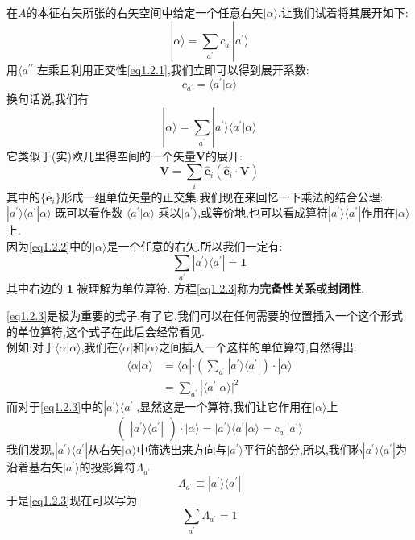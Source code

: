 \documentclass[lang=cn,newtx,10pt,scheme=chinese,thmcnt=section]{elegantbook}
\begin{document}
在$A$的本征右矢所张的右矢空间中给定一个任意右矢$|\alpha\rangle$,让我们试着将其展开如下:
\begin{equation}
	|\alpha\rangle=\sum_{a^{\prime}}c_{a^{\prime}}|a^{\prime}\rangle
\end{equation}
用$\langle a^{\prime\prime}|$左乘且利用正交性\ref{eq1.2.1},我们立即可以得到展开系数:
$$c_{a^{\prime}}=\langle a^{\prime}|\alpha\rangle$$
换句话说,我们有
\begin{equation}\label{eq1.2.2}
	|\alpha\rangle=\sum_{a^{\prime}}|a^{\prime}\rangle\langle a^{\prime}|\alpha\rangle
\end{equation}
它类似于(实)欧几里得空间的一个矢量$\mathbf{V}$的展开:
$$\mathbf{V}=\sum_i\hat{\mathbf{e}}_i(\hat{\mathbf{e}}_i\cdot\mathbf{V})$$
其中的$\{\hat{\mathbf{e}}_i\}$形成一组单位矢量的正交集.我们现在来回忆一下乘法的结合公理:$|a^\prime\rangle\langle a^{\prime}|\alpha\rangle$ 既可以看作数 $\langle a^\prime|\alpha\rangle$ 乘以$|a^\prime\rangle$,或等价地,也可以看成算符$|a^\prime\rangle\langle a^\prime|$作用在$|\alpha\rangle$上.\\
因为\ref{eq1.2.2}中的$|\alpha\rangle$是一个任意的右矢.所以我们一定有:
\begin{equation}\label{eq1.2.3}
	\sum_{a^{\prime}}|a^{\prime}\rangle\langle a^{\prime}|=\mathbf{1}
\end{equation}
其中右边的 $\mathbf{1}$ 被理解为单位算符. 方程\ref{eq1.2.3}称为\textbf{完备性关系}或\textbf{封闭性}.

\ref{eq1.2.3}是极为重要的式子,有了它,我们可以在任何需要的位置插入一个这个形式的单位算符,这个式子在此后会经常看见.\\
例如:对于$\langle\alpha|\alpha\rangle$,我们在$\langle\alpha|$和$|\alpha\rangle$之间插入一个这样的单位算符,自然得出:
\begin{equation}
	\begin{aligned}
		\langle\alpha|\alpha\rangle&=\langle\alpha|\cdot(\sum_{a^{\prime}}|a^{\prime}\rangle\langle a^{\prime}|)\cdot|\alpha\rangle\\&=\sum_{a^{\prime}}|\langle a^{\prime}|\alpha\rangle|^2
	\end{aligned}
\end{equation}
而对于\ref{eq1.2.3}中的$|a^{\prime}\rangle\langle a^{\prime}|$,显然这是一个算符,我们让它作用在$|\alpha\rangle$上
\begin{equation}
	(\begin{array}{c}|a^{\prime}\rangle\langle a^{\prime}|\end{array})\cdot|\alpha\rangle=|a^{\prime}\rangle\langle a^{\prime}|\alpha\rangle=c_{a^{\prime}}|a^{\prime}\rangle 
\end{equation}
我们发现,$|a^{\prime}\rangle\langle a^{\prime}|$从右矢$|\alpha\rangle$中筛选出来方向与$|a^{'}\rangle$平行的部分,所以,我们称$|a^{\prime}\rangle\langle a^{\prime}|$为沿着基右矢$|a^{'}\rangle$的投影算符$\Lambda_{a^{\prime}}$\
\begin{equation}
	\Lambda_{a^{\prime}}\equiv| a^{\prime}\rangle\langle a^{\prime}| 
\end{equation}
于是\ref{eq1.2.3}现在可以写为
\begin{equation}
	\sum_{a^{\prime}}\Lambda_{a^{\prime}}=1
\end{equation}
\end{document}
